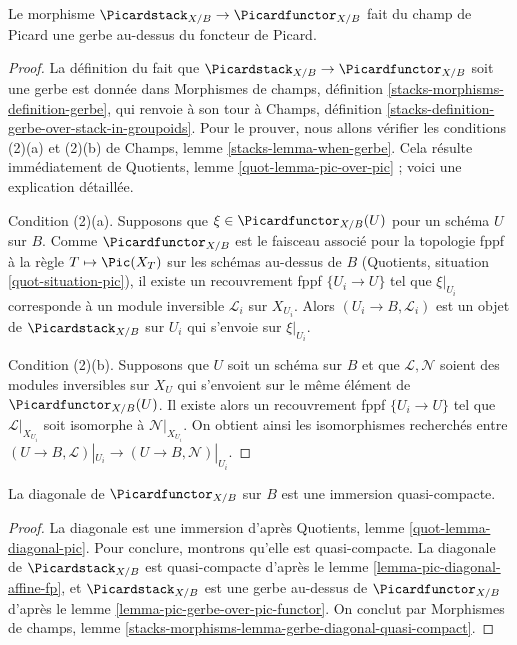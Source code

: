 \begin{lemma}
\label{lemma-pic-gerbe-over-pic-functor}
Le morphisme $\Picardstack_{X/B} \to \Picardfunctor_{X/B}$ fait du champ
de Picard une gerbe au-dessus du foncteur de Picard.
\end{lemma}

\begin{proof}
La définition du fait que
$\Picardstack_{X/B} \to \Picardfunctor_{X/B}$ soit une gerbe est donnée
dans Morphismes de champs, définition
\ref{stacks-morphisms-definition-gerbe}, qui renvoie à son tour à Champs,
définition \ref{stacks-definition-gerbe-over-stack-in-groupoids}.
Pour le prouver, nous allons vérifier les conditions (2)(a) et (2)(b) de
Champs, lemme \ref{stacks-lemma-when-gerbe}. Cela résulte immédiatement de
Quotients, lemme \ref{quot-lemma-pic-over-pic} ; voici une explication
détaillée.

\medskip\noindent
Condition (2)(a).
Supposons que $\xi \in \Picardfunctor_{X/B}(U)$ pour un schéma $U$ sur
$B$. Comme $\Picardfunctor_{X/B}$ est le faisceau associé pour la topologie
fppf à la règle $T \mapsto \Pic(X_T)$ sur les schémas au-dessus de $B$
(Quotients, situation \ref{quot-situation-pic}), il existe un recouvrement
fppf $\{U_i \to U\}$ tel que $\xi|_{U_i}$ corresponde à un module
inversible $\mathcal{L}_i$ sur $X_{U_i}$.
Alors $(U_i \to B, \mathcal{L}_i)$ est un objet de
$\Picardstack_{X/B}$ sur $U_i$ qui s'envoie sur $\xi|_{U_i}$.

\medskip\noindent
Condition (2)(b). Supposons que $U$ soit un schéma sur $B$ et que
$\mathcal{L}, \mathcal{N}$ soient des modules inversibles sur $X_U$ qui
s'envoient sur le même élément de $\Picardfunctor_{X/B}(U)$.
Il existe alors un recouvrement fppf $\{U_i \to U\}$ tel que
$\mathcal{L}|_{X_{U_i}}$ soit isomorphe à
$\mathcal{N}|_{X_{U_i}}$. On obtient ainsi les isomorphismes recherchés
entre
$(U \to B, \mathcal{L})|_{U_i} \to
(U \to B, \mathcal{N})|_{U_i}$.
\end{proof}

\begin{lemma}
\label{lemma-pic-functor-diagonal-qc-immersion}
La diagonale de $\Picardfunctor_{X/B}$ sur $B$ est une immersion
quasi-compacte.
\end{lemma}

\begin{proof}
La diagonale est une immersion d'après Quotients, lemme
\ref{quot-lemma-diagonal-pic}. Pour conclure, montrons qu'elle est
quasi-compacte. La diagonale de $\Picardstack_{X/B}$ est quasi-compacte
d'après le lemme \ref{lemma-pic-diagonal-affine-fp}, et
$\Picardstack_{X/B}$ est une gerbe au-dessus de
$\Picardfunctor_{X/B}$ d'après le lemme
\ref{lemma-pic-gerbe-over-pic-functor}.
On conclut par Morphismes de champs, lemme
\ref{stacks-morphisms-lemma-gerbe-diagonal-quasi-compact}.
\end{proof}

